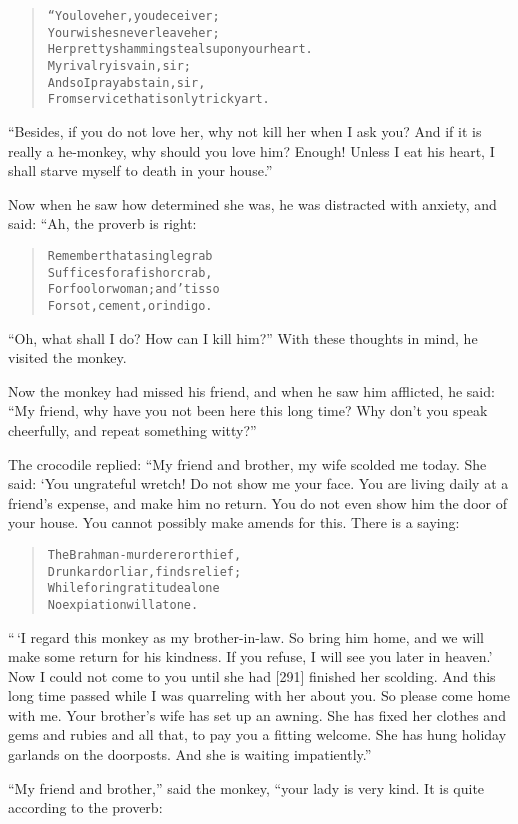 \documentclass[article, twoside, 14pt]{memoir}
\renewenvironment{verbatim}{%
\begin{quote}%
\vskip -10pt%
\begin{alltt}\normalfont\large}{\end{alltt}%
\end{quote}%
\vskip -10pt
} %
\begin{document}
\begin{verbatim}
“You love her, you deceiver;
Your wishes never leave her;
Her pretty shamming steals upon your heart.
    My rivalry is vain, sir;
    And so I pray abstain, sir,
From service that is only tricky art.
\end{verbatim}
``Besides, if you do not love her, why not kill her when I ask you? And if it is really a he-monkey, why should you love him? Enough! Unless I eat his heart, I shall starve myself to death in your house.''

Now when he saw how determined she was, he was distracted with
anxiety, and said: “Ah, the proverb is right:

\begin{verbatim}
Remember that a single grab
Suffices for a fish or crab,
For fool or woman; and 'tis so
For sot, cement, or indigo.
\end{verbatim}
``Oh, what shall I do? How can I kill him?'' With these thoughts in
mind, he visited the monkey.

Now the monkey had missed his friend, and when he saw him
afflicted, he said:
``My friend, why have you not been here this long time? Why don't you speak cheerfully, and repeat something witty?''

The crocodile replied: “My friend and brother, my wife scolded me
today. She said: ‘You ungrateful wretch! Do not show me your face.
You are living daily at a friend's expense, and make him no return.
You do not even show him the door of your house. You cannot
possibly make amends for this. There is a saying:

\begin{verbatim}
The Brahman-murderer or thief,
Drunkard or liar, finds relief;
While for ingratitude alone
No expiation will atone.
\end{verbatim}
``\,`I regard this monkey as my brother-in-law. So bring him home, and we will make some return for his kindness. If you refuse, I will see you later in heaven.' Now I could not come to you until she had [291] finished her scolding. And this long time passed while I was quarreling with her about you. So please come home with me. Your brother's wife has set up an awning. She has fixed her clothes and gems and rubies and all that, to pay you a fitting welcome. She has hung holiday garlands on the doorposts. And she is waiting impatiently.''

``My friend and brother,'' said the monkey, “your lady is very
kind. It is quite according to the proverb:
\end{document}
